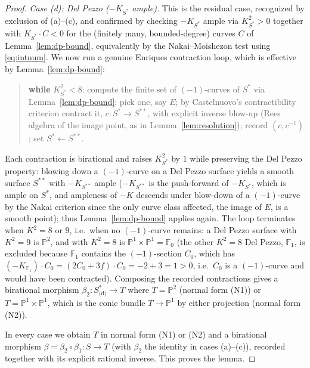 \documentclass{amsart}
\theoremstyle{plain}
\theoremstyle{definition}
\newcommand{\PP}{\mathbb{P}}
\begin{document}
\begin{proof}
\emph{Case (d): Del Pezzo ($-K_{S^\ast}$ ample).}  This is the residual case,
recognized by exclusion of (a)--(c), and confirmed by checking $-K_{S^\ast}$
ample via $K_{S^\ast}^2>0$ together with $K_{S^\ast}\cdot C<0$ for the (finitely
many, bounded-degree) curves $C$ of Lemma~\ref{lem:dp-bound}, equivalently by the
Nakai--Moishezon test using \eqref{eq:intnum}.  We now run a genuine Enriques
contraction loop, which is effective by Lemma~\ref{lem:dp-bound}:
\begin{quote}
\textbf{while} $K_{S^\ast}^2<8$:\quad
compute the finite set of $(-1)$-curves of $S^\ast$ via
Lemma~\ref{lem:dp-bound}; pick one, say $E$; by Castelnuovo's contractibility
criterion contract it, $c\colon S^\ast\to S^{\ast\ast}$, with explicit inverse
blow-up (Rees algebra of the image point, as in Lemma~\ref{lem:resolution});
record $(c,c^{-1})$; set $S^\ast\leftarrow S^{\ast\ast}$.
\end{quote}
Each contraction is birational and raises $K_{S^\ast}^2$ by $1$ while preserving
the Del Pezzo property: blowing down a $(-1)$-curve on a Del Pezzo surface yields
a smooth surface $S^{\ast\ast}$ with $-K_{S^{\ast\ast}}$ ample
\textup{(}$-K_{S^{\ast\ast}}$ is the push-forward of $-K_{S^\ast}$, which is ample
on $S^\ast$, and ampleness of $-K$ descends under blow-down of a $(-1)$-curve by
the Nakai criterion since the only curve class affected, the image of $E$, is a
smooth point\textup{)}; thus Lemma~\ref{lem:dp-bound} applies again.  The loop
terminates when $K^2=8$ or $9$, i.e.\ when no $(-1)$-curve remains: a Del Pezzo
surface with $K^2=9$ is $\PP^2$, and with $K^2=8$ is $\PP^1\times\PP^1=\mathbb
F_0$ (the other $K^2=8$ Del Pezzo, $\mathbb F_1$, is excluded because $\mathbb
F_1$ contains the $(-1)$-section $C_0$, which has $(-K_{\mathbb F_1})\cdot C_0
=(2C_0+3f)\cdot C_0=-2+3=1>0$, i.e.\ $C_0$ is a $(-1)$-curve and would have been
contracted).  Composing the recorded contractions gives a birational morphism
$\beta_2\colon S^\ast_{\text{(d)}}\to T$ where $T=\PP^2$ (normal form (N1)) or
$T=\PP^1\times\PP^1$, which is the conic bundle $T\to\PP^1$ by either projection
(normal form (N2)).

\medskip In every case we obtain $T$ in normal form (N1) or (N2) and a birational
morphism $\beta=\beta_2\circ\beta_1\colon S\to T$ \textup{(}with $\beta_2$ the
identity in cases (a)--(c)\textup{)}, recorded together with its explicit
rational inverse.  This proves the lemma.
\end{proof}
\end{document}
